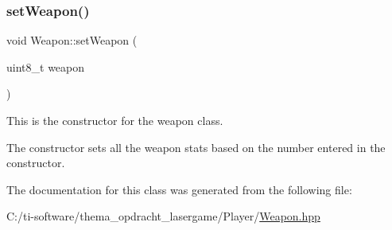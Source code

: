 \subsubsection{\texorpdfstring{set\+Weapon()}{setWeapon()}}
{\footnotesize\ttfamily void Weapon\+::set\+Weapon (\begin{DoxyParamCaption}\item[{uint8\+\_\+t}]{weapon }\end{DoxyParamCaption})\hspace{0.3cm}{\ttfamily [inline]}}



This is the constructor for the weapon class. 

The constructor sets all the weapon stats based on the number entered in the constructor. 

The documentation for this class was generated from the following file\+:\begin{DoxyCompactItemize}
\item 
C\+:/ti-\/software/thema\+\_\+opdracht\+\_\+lasergame/\+Player/\mbox{\hyperlink{_weapon_8hpp}{Weapon.\+hpp}}\end{DoxyCompactItemize}
